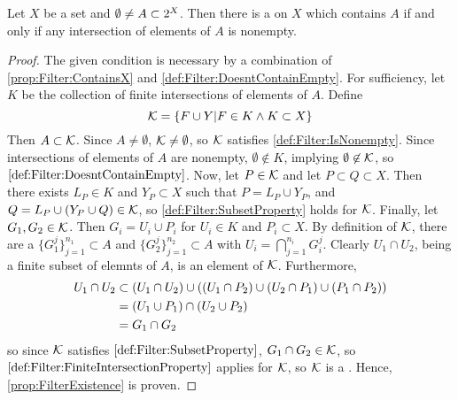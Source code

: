 \begin{prop}
\label{prop:FilterExistence}
    Let $X$ be a set and
    $\emptyset \neq A \subset 2^{X}$.
    Then there is a \Filter
    on $X$ which contains $A$ if and only if 
    any \Finite intersection of elements of $A$ 
    is nonempty. 
    \begin{proof}
        The given condition is necessary by a combination 
        of \ref{prop:Filter:ContainsX} and \ref{def:Filter:DoesntContainEmpty}.
        For sufficiency,
        let $K$ be the collection of finite intersections
        of elements of $A$. 
        Define 
        \begin{equation}
        \mathcal{K} = \{ F \cup Y | F \in K \wedge K \subset X\}
        \end{equation}
        Then $A \subset \mathcal{K}$. 
        Since $A \neq \emptyset$, $\mathcal{K} \neq \emptyset$, 
        so $\mathcal{K}$ satisfies \ref{def:Filter:IsNonempty}. 
        Since \Finite intersections of elements of $A$
        are nonempty, $\emptyset \not \in K$, implying 
        $\emptyset \not \in \mathcal{K}$, so $\ref{def:Filter:DoesntContainEmpty}$. 
        Now, let $P \in \mathcal{K}$ and let $P \subset Q \subset X$.
        Then there exists $L_P \in K$ and $Y_P \subset X$ such that 
        $P = L_P \cup Y_P$, 
        and $Q = L_P \cup \left( Y_P \cup Q\right) \in \mathcal{K}$, so \ref{def:Filter:SubsetProperty}
        holds for $\mathcal{K}$. 
        Finally, let 
        $G_1,G_2 \in \mathcal{K}$. Then 
        $G_i=U_i \cup P_i$ for $U_i \in K$ and $P_i \subset X$. 
        By definition of $\mathcal{K}$, 
        there are a $\{G_1^j\}_{j=1}^{n_1} \subset A$ 
        and $\{G_2^j\}_{j=1}^{n_2} \subset A$ with 
        $U_i = \bigcap\limits_{j=1}^{n_i} G_i^j$. 
        Clearly $U_1 \cap U_2$, being a finite subset of elemnts of $A$, 
        is an element of $\mathcal{K}$. 
        Furthermore, 
        \begin{align*}
            U_1 \cap U_2 & \subset \left( U_1 \cap U_2\right) \cup \left( \left( U_1 \cap P_2\right) \cup \left( U_2 \cap P_1\right) \cup \left( P_1 \cap P_2\right)\right)\\
                & = \left( U_1 \cup P_1\right) \cap \left(  U_2 \cup P_2 \right) \\
                & = G_1 \cap G_2
        \end{align*}
        so since $\mathcal{K}$ satisfies $\ref{def:Filter:SubsetProperty}$, 
        $G_1 \cap G_2 \in \mathcal{K}$, so $\ref{def:Filter:FiniteIntersectionProperty}$ 
        applies for $\mathcal{K}$, so $\mathcal{K}$ is a \Filter. 
        Hence,  \ref{prop:FilterExistence} is proven.
    \end{proof}
\end{prop}
